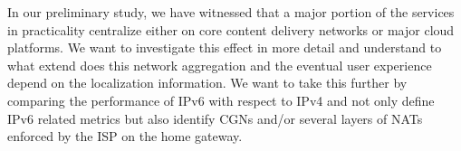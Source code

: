 In our preliminary study, we have witnessed that a major portion of the
services in practicality centralize either on core content delivery networks
or major cloud platforms. We want to investigate this effect in more detail
and understand to what extend does this network aggregation and the eventual
user experience depend on the localization information. We want to take this
further by comparing the performance of IPv6 with respect to IPv4 and not only
define IPv6 related metrics but also identify \ac{CGN}s and/or several layers
of \ac{NAT}s enforced by the ISP on the home gateway.

